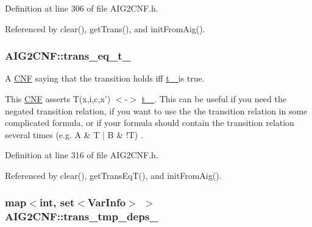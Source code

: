 Definition at line 306 of file A\-I\-G2\-C\-N\-F.\-h.



Referenced by clear(), get\-Trans(), and init\-From\-Aig().

\hypertarget{classAIG2CNF_af7e9b65092f626865a4aa541a48e4f1b}{
\subsubsection[{trans\-\_\-eq\-\_\-t\-\_\-}]{ A\-I\-G2\-C\-N\-F\-::trans\-\_\-eq\-\_\-t\-\_\-\hspace{0.3cm}{\ttfamily [protected]}}}\label{classAIG2CNF_af7e9b65092f626865a4aa541a48e4f1b}


A \hyperlink{classCNF}{C\-N\-F} saying that the transition holds iff \hyperlink{classAIG2CNF_af2a7f6ecdcec3b5b2f37a11b0adde65a}{t\-\_\- } is true. 

This \hyperlink{classCNF}{C\-N\-F} asserts T(x,i,c,x') $<$-\/$>$ \hyperlink{classAIG2CNF_af2a7f6ecdcec3b5b2f37a11b0adde65a}{t\-\_\- }. This can be useful if you need the negated transition relation, if you want to use the the transition relation in some complicated formula, or if your formula should contain the transition relation several times (e.\-g. A \& T $\vert$ B \& !\-T) . 

Definition at line 316 of file A\-I\-G2\-C\-N\-F.\-h.



Referenced by clear(), get\-Trans\-Eq\-T(), and init\-From\-Aig().

\hypertarget{classAIG2CNF_a8617860055dfa8cbcc1f572676f57b84}{
\subsubsection[{trans\-\_\-tmp\-\_\-deps\-\_\-}]{\setlength{\rightskip}{0pt plus 5cm}map$<$int, set$<${\bf Var\-Info}$>$ $>$ A\-I\-G2\-C\-N\-F\-::trans\-\_\-tmp\-\_\-deps\-\_\-\hspace{0.3cm}{\ttfamily [protected]}}}\label{classAIG2CNF_a8617860055dfa8cbcc1f572676f57b84}


